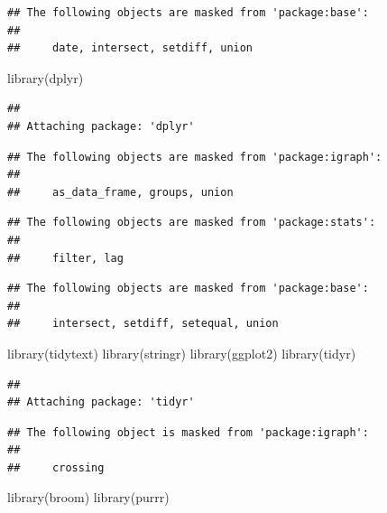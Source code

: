 \documentclass[]{tufte-book}
\newenvironment{Shaded}{}{}
\newcommand{\FunctionTok}[1]{\textcolor[rgb]{0.02,0.16,0.49}{#1}}
\newcommand{\NormalTok}[1]{#1}
\begin{document}
\begin{verbatim}
## The following objects are masked from 'package:base':
## 
##     date, intersect, setdiff, union
\end{verbatim}

\begin{Shaded}
\begin{Highlighting}[]
\FunctionTok{library}\NormalTok{(dplyr)}
\end{Highlighting}
\end{Shaded}

\begin{verbatim}
## 
## Attaching package: 'dplyr'
\end{verbatim}

\begin{verbatim}
## The following objects are masked from 'package:igraph':
## 
##     as_data_frame, groups, union
\end{verbatim}

\begin{verbatim}
## The following objects are masked from 'package:stats':
## 
##     filter, lag
\end{verbatim}

\begin{verbatim}
## The following objects are masked from 'package:base':
## 
##     intersect, setdiff, setequal, union
\end{verbatim}

\begin{Shaded}
\begin{Highlighting}[]
\FunctionTok{library}\NormalTok{(tidytext)}
\FunctionTok{library}\NormalTok{(stringr)}
\FunctionTok{library}\NormalTok{(ggplot2)}
\FunctionTok{library}\NormalTok{(tidyr)}
\end{Highlighting}
\end{Shaded}

\begin{verbatim}
## 
## Attaching package: 'tidyr'
\end{verbatim}

\begin{verbatim}
## The following object is masked from 'package:igraph':
## 
##     crossing
\end{verbatim}

\begin{Shaded}
\begin{Highlighting}[]
\FunctionTok{library}\NormalTok{(broom)}
\FunctionTok{library}\NormalTok{(purrr)}
\end{Highlighting}
\end{Shaded}
\end{document}
